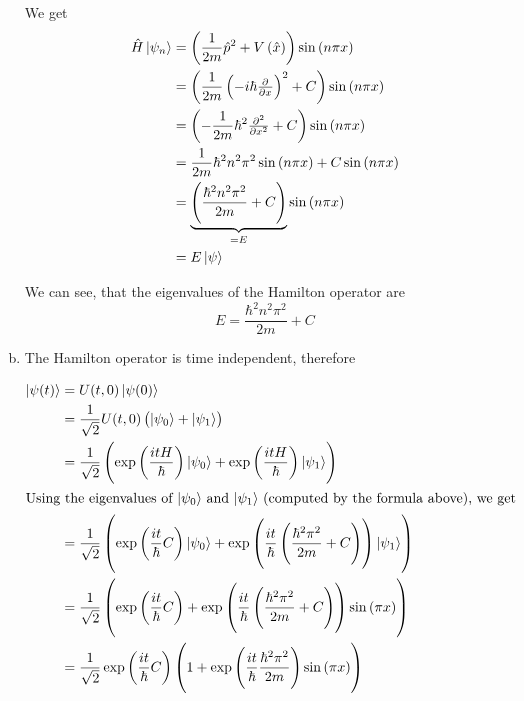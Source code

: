 \documentclass[a4paper,german,12pt,smallheadings]{scrartcl}
\begin{document}
\begin{enumerate}[a)]
    We get
    \begin{align*}
      \hat H\ket{\psi_n} &= \del{\frac{1}{2m} \hat{p}^2 + V\del{\hat{x}}} \sin\del{n \pi x} \\
                         &= \del{\frac{1}{2m} \del{-i\hbar \pd{}{x}}^2 + C} \sin\del{n \pi x} \\
                         &= \del{-\frac{1}{2m} \hbar^2 \pd[2]{}{x} + C} \sin\del{n \pi x} \\
                         &= \frac{1}{2m} \hbar^2 n^2\pi^2 \sin\del{n \pi x} + C \sin\del{n \pi x} \\
                         &= \underbrace{\del{\frac{\hbar^2 n^2 \pi^2}{2m} + C}}_{=E} \sin\del{n \pi x} \\
                         &= E \ket{\psi}
    \end{align*}

    We can see, that the eigenvalues of the Hamilton operator are
    \begin{equation*}
      E = \frac{\hbar^2 n^2 \pi^2}{2m} + C
    \end{equation*}

  \item
    The Hamilton operator is time independent, therefore

    \begin{align*}
      \ket{\psi(t)} &= U(t,0) \ket{\psi(0)} \\
                    &= \frac{1}{\sqrt{2}} U(t,0) \del{\ket{\psi_0} + \ket{\psi_1}} \\
                    &= \frac{1}{\sqrt{2}} \del{\exp\del{\frac{itH}{\hbar}} \ket{\psi_0} + \exp\del{\frac{itH}{\hbar}} \ket{\psi_1}} \\
      \intertext{Using the eigenvalues of $\ket{\psi_0}$ and $\ket{\psi_1}$ (computed by the formula above), we get}
      &= \frac{1}{\sqrt{2}} \del{\exp\del{\frac{it}{\hbar} C} \ket{\psi_0} + \exp\del{\frac{it}{\hbar} \del{\frac{\hbar^2 \pi^2}{2m} + C}} \ket{\psi_1}} \\
      &= \frac{1}{\sqrt{2}} \del{\exp\del{\frac{it}{\hbar} C} + \exp\del{\frac{it}{\hbar} \del{\frac{\hbar^2 \pi^2}{2m} + C}} \sin\del{\pi x}} \\
      &= \frac{1}{\sqrt{2}} \exp\del{\frac{it}{\hbar} C} \del{1 + \exp\del{\frac{it}{\hbar} \frac{\hbar^2 \pi^2}{2m}} \sin\del{\pi x}} \\
    \end{align*}


\end{enumerate}
\end{document}
